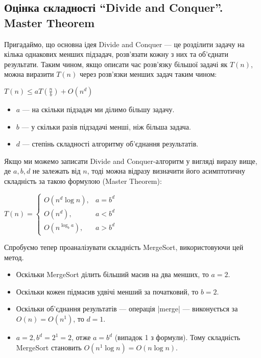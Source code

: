\documentclass[12pt,a4paper]{report}
\begin{document}
\subsection{Оцінка складності ``Divide and Conquer''. Master Theorem}

Пригадаймо, що основна ідея Divide and Conquer --- це розділити задачу на кілька однакових менших підзадач, розв’язати кожну з них та об’єднати результати. Таким чином, якщо описати час розв’язку більшої задачі як \(T(n)\), можна виразити \(T(n)\) через розв’язки менших задач таким чином:

\begin{center}
\begin{math}
T(n) \leq a T \left(\frac{n}{b}\right) + O(n ^ d)
\end{math}
\end{center}

\begin{itemize}
    \item \(a\) --- на скільки підзадач ми ділимо більшу задачу.
    \item \(b\) --- у скільки разів підзадачі менші, ніж більша задача.
    \item \(d\) --- степінь складності алгоритму об’єднання результатів.
\end{itemize}

Якщо ми можемо записати Divide and Conquer-алгоритм у вигляді виразу вище, де \(a, b, d\) не залежать від \(n\), тоді можна відразу визначити його асимптотичну складність за такою формулою (Master Theorem):

\begin{center}
\begin{math}
T(n) = 
    \begin{cases}
        O(n ^ d \log n),      & a = b ^ d \\
        O(n ^ d),             & a < b ^ d \\
        O(n ^ {\log_b a}),    & a > b ^ d
    \end{cases}
\end{math}
\end{center}

Спробуємо тепер проаналізувати складність MergeSort, використовуючи цей метод.

\begin{itemize}
    \item Оскільки MergeSort ділить більший масив на два менших, то \(a = 2\).
    \item Оскільки кожен підмасив удвічі менший за початковий, то \(b = 2\).
    \item Оскільки об’єднання результатів --- операція |merge| --- виконується за \(O(n) = O(n ^ 1)\), то \(d = 1\).
    \item \(a = 2, b ^ d = 2 ^ 1 = 2\), отже \(a = b ^ d\) (випадок 1 з формули). Тому складність MergeSort становить \(O(n ^ 1 \log n) = O(n \log n)\).
\end{itemize}
\end{document}
